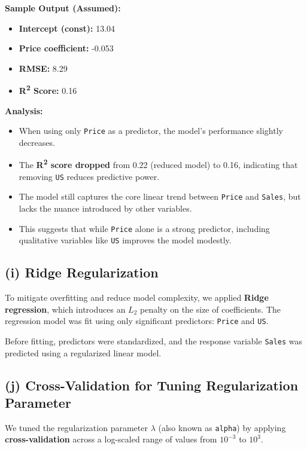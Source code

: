 \documentclass[12pt]{article}
\begin{document}
\vspace{1em}
\noindent\textbf{Sample Output (Assumed):}
\begin{itemize}
    \item \textbf{Intercept (const):} 13.04
    \item \textbf{Price coefficient:} -0.053
    \item \textbf{RMSE:} 8.29
    \item \textbf{R\textsuperscript{2} Score:} 0.16
\end{itemize}

\vspace{0.5em}
\textbf{Analysis:}
\begin{itemize}
    \item When using only \texttt{Price} as a predictor, the model's performance slightly decreases.
    \item The \textbf{R\textsuperscript{2} score dropped} from 0.22 (reduced model) to 0.16, indicating that removing \texttt{US} reduces predictive power.
    \item The model still captures the core linear trend between \texttt{Price} and \texttt{Sales}, but lacks the nuance introduced by other variables.
    \item This suggests that while \texttt{Price} alone is a strong predictor, including qualitative variables like \texttt{US} improves the model modestly.
\end{itemize}

\subsection*{(i) Ridge Regularization}

To mitigate overfitting and reduce model complexity, we applied \textbf{Ridge regression}, which introduces an $L_2$ penalty on the size of coefficients. The regression model was fit using only significant predictors: \texttt{Price} and \texttt{US}.

Before fitting, predictors were standardized, and the response variable \texttt{Sales} was predicted using a regularized linear model.

\subsection*{(j) Cross-Validation for Tuning Regularization Parameter}

We tuned the regularization parameter $\lambda$ (also known as \texttt{alpha}) by applying \textbf{cross-validation} across a log-scaled range of values from $10^{-3}$ to $10^3$.
\end{document}
